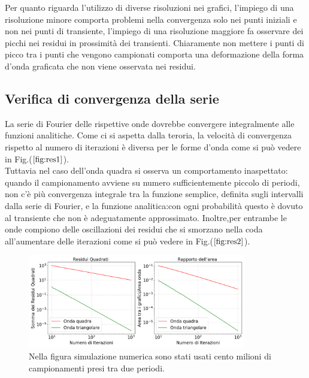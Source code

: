 \documentclass{article}
\begin{document}
        \noindent Per quanto riguarda l'utilizzo di diverse risoluzioni nei grafici, l'impiego di una risoluzione 
        minore comporta problemi nella convergenza solo nei punti iniziali e non nei punti di transiente,
        l'impiego di una risoluzione maggiore fa osservare dei picchi nei residui in prossimità dei transienti.
        Chiaramente non mettere i punti di picco tra i punti che vengono campionati 
        comporta una deformazione della forma d'onda graficata che non viene osservata 
        nei residui.




    \subsection{Verifica di convergenza della serie}
    \label{sez:residui}
       
        La serie di Fourier delle rispettive onde dovrebbe convergere integralmente alle funzioni analitiche.
        Come ci si aspetta dalla teroria, la velocità di convergenza rispetto al numero 
        di iterazioni è diversa per le forme d'onda come si può vedere 
        in Fig.($\ref{fig:res1}$).\\ 
        Tuttavia nel caso dell'onda quadra si osserva un comportamento inaspettato:
        quando il campionamento avviene su numero sufficientemente
        piccolo di periodi,  non c'è più convergenza integrale tra la funzione semplice, definita sugli 
        intervalli dalla serie di Fourier, e la funzione analitica:con ogni
        probabilità questo è dovuto al transiente che non è adeguatamente approssimato.
        Inoltre,per entrambe le onde compiono delle oscillazioni dei residui che si
        smorzano nella coda all'aumentare delle iterazioni come 
        si può vedere in Fig.($\ref{fig:res2}$).
        

        \begin{figure}[H]
            \centering
            \includegraphics[width=0.85\textwidth]{residuals1.png} %
            \caption{Nella figura simulazione numerica sono stati usati cento milioni di campionamenti presi tra due periodi.}
            \label{fig:res1}
        \end{figure}
\end{document}

